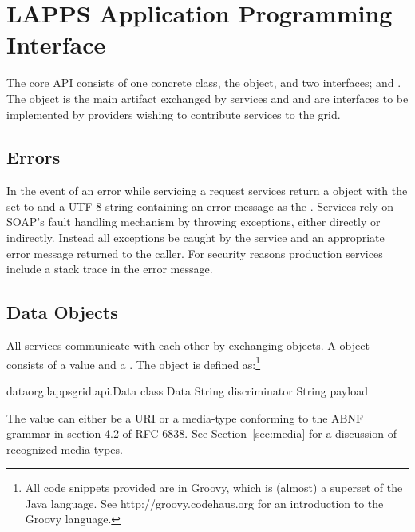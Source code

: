 
\section{LAPPS Application Programming Interface}

The core  \lapps  API consists of one concrete class, the \data  object, and two interfaces; \source and \service.  The \data object is the main artifact exchanged by \lapps services and \source and \service are interfaces to be implemented by providers wishing to contribute services to the \lapps grid.  


\subsection{Errors}

In the event of an error while servicing a request \lapps services \should return a \data object with the \discriminator set to  and a UTF-8 string containing an error message as the \payload. Services \shouldnot rely on SOAP's fault handling mechanism by throwing exceptions, either directly or indirectly. Instead all exceptions \should be caught by the service and an appropriate error message returned to the caller. For security reasons production services \shouldnot include a stack trace in the error message.


\subsection{Data Objects}
All \lapps services communicate with each other by exchanging \data objects.  A \data object consists of a \discriminator value and a \payload.  The \data object is defined as:\footnote{All code snippets provided are in Groovy, which is (almost) a superset of the Java language.  See http://groovy.codehaus.org for an introduction to the Groovy language.}

\begin{groovy}{data}{org.lappsgrid.api.Data}
	class Data {
		String discriminator
		String payload
	}
\end{groovy}

The \discriminator value can either be a URI or a media-type conforming to the ABNF grammar in section 4.2 of RFC 6838\cite{rfc6838}. See Section~\ref{sec:media} for a discussion of recognized \lapps media types.


